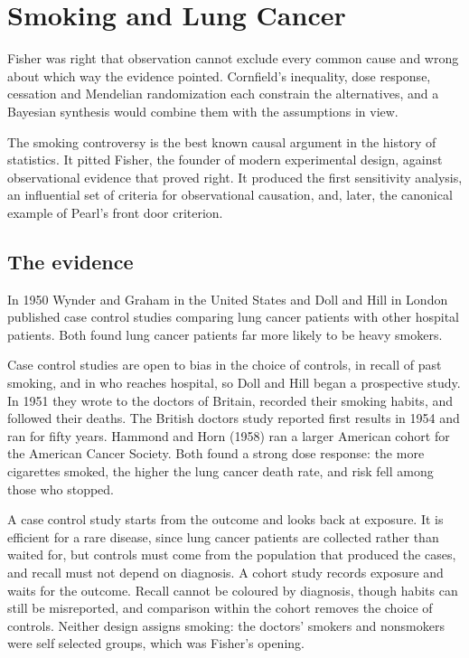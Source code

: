 \chapter{Smoking and Lung Cancer}\label{ch:smoking}

\begin{tcolorbox}[colback=gray!6,colframe=gray!50,title=In brief,fonttitle=\normalfont\itshape,coltitle=black,colbacktitle=gray!15,boxrule=0.4pt,arc=1pt]
Fisher was right that observation cannot exclude every common cause and wrong about which way the evidence pointed. Cornfield's inequality, dose response, cessation and Mendelian randomization each constrain the alternatives, and a Bayesian synthesis would combine them with the assumptions in view.
\end{tcolorbox}

The smoking controversy is the best known causal argument in the history of statistics. It pitted Fisher, the founder of modern experimental design, against observational evidence that proved right. It produced the first sensitivity analysis, an influential set of criteria for observational causation, and, later, the canonical example of Pearl's front door criterion. 

\section{The evidence}

In 1950 Wynder and Graham in the United States and Doll and Hill in London published case control studies comparing lung cancer patients with other hospital patients. Both found lung cancer patients far more likely to be heavy smokers.

Case control studies are open to bias in the choice of controls, in recall of past smoking, and in who reaches hospital, so Doll and Hill began a prospective study. In 1951 they wrote to the doctors of Britain, recorded their smoking habits, and followed their deaths. The British doctors study reported first results in 1954 and ran for fifty years. Hammond and Horn (1958) ran a larger American cohort for the American Cancer Society. Both found a strong dose response: the more cigarettes smoked, the higher the lung cancer death rate, and risk fell among those who stopped.

A case control study starts from the outcome and looks back at exposure. It is efficient for a rare disease, since lung cancer patients are collected rather than waited for, but controls must come from the population that produced the cases, and recall must not depend on diagnosis. A cohort study records exposure and waits for the outcome. Recall cannot be coloured by diagnosis, though habits can still be misreported, and comparison within the cohort removes the choice of controls. Neither design assigns smoking: the doctors' smokers and nonsmokers were self selected groups, which was Fisher's opening.


